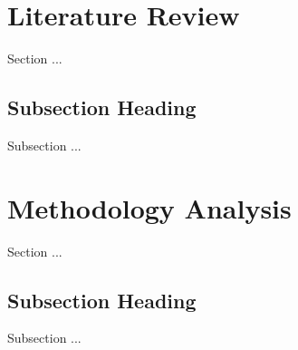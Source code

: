 \documentclass[journal]{IEEEtran}
\begin{document}












\section{Literature Review}
Section ...


\subsection{Subsection Heading}
Subsection ...












\section{Methodology Analysis}
Section ...


\subsection{Subsection Heading}
Subsection ...


\end{document}
